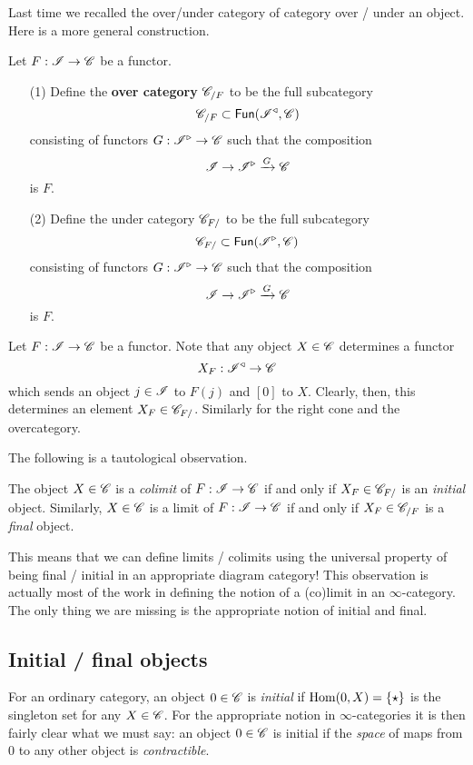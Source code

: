 \documentclass[11pt]{amsart}
\def\Fun{{\sf Fun}}
\def\lcone{\triangleleft}
\def\rcone{\triangleright}
\begin{document}
Last time we recalled the over/under category of category over / under an object. 
Here is a more general construction. 

\begin{dfn}
Let $F : \mathscr I \to \mathscr C$ be a functor. 
\begin{itemize}
\item[(1)]
Define the {\bf over category} $\mathscr C_{/F}$ to be the full subcategory
\[
\sC_{/F} \subset \Fun(\sI^{\lcone}, \sC)
\]
consisting of functors $G : \sI^{\rcone} \to \sC$ such that the composition
\[
\sI \to \sI^{\rcone} \xto{G} \sC
\]
is $F$. 

\item[(2)]
Define the under category $\mathscr C_{F /}$ to be the full subcategory
\[
\sC_{F / } \subset \Fun(\sI^{\rcone}, \sC)
\]
consisting of functors $G : \sI^{\rcone} \to \sC$ such that the composition
\[
\sI \to \sI^{\rcone} \xto{G} \sC
\]
is $F$. 
\end{itemize}
\end{dfn}

Let $F : \mathscr I \to \mathscr C$ be a functor.
Note that any object $X \in \mathscr C$ determines a functor
\[
X_F : \sI^{\lcone} \to \sC
\]
which sends an object $j \in \mathscr I$ to $F(j)$ and $[0]$ to $X$. 
Clearly, then, this determines an element $X_F \in \mathscr C_{F /}$. 
Similarly for the right cone and the overcategory. 

The following is a tautological observation. 
\begin{lem}
The object $X \in \mathscr C$ is a {\em colimit} of $F : \mathscr I \to \mathscr C$ if and only if $X_F \in \mathscr C_{F /}$ is an {\em initial} object.
Similarly, $X \in \mathscr C$ is a limit of $F : \mathscr I \to \mathscr C$ if and only if $X_F \in \mathscr C_{/F}$ is a {\em final} object. 
\end{lem}

This means that we can define limits / colimits using the universal property of being final / initial in an appropriate diagram category!
This observation is actually most of the work in defining the notion of a (co)limit in an $\infty$-category.
The only thing we are missing is the appropriate notion of initial and final.

\subsection{Initial / final objects}

For an ordinary category, an object $0 \in \mathscr C$ is {\em initial} if ${\rm Hom}(0, X) = \{\star\}$ is the singleton set for any $X \in \mathscr C$. 
For the appropriate notion in $\infty$-categories it is then fairly clear what we must say: an object $0 \in \mathscr C$ is initial if the {\em space} of maps from $0$ to any other object is {\em contractible}. 
\end{document}

